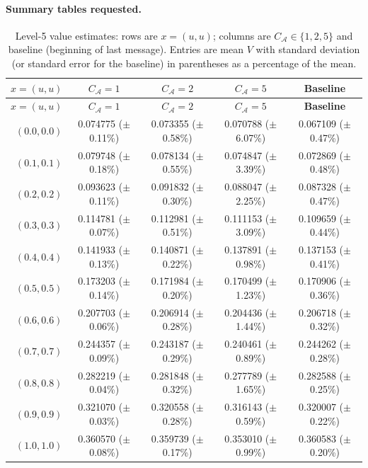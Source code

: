 \documentclass[11pt]{article}
\theoremstyle{definition}
\theoremstyle{plain}
\begin{document}
\begin{appendices}
\paragraph{Summary tables requested.}
\begin{longtable}{@{}rcccc@{}}
\caption{Level-5 value estimates: rows are $x=(u,u)$; columns are $C_{\mathcal A}\in\{1,2,5\}$ and baseline (beginning of last message). Entries are mean $V$ with standard deviation (or standard error for the baseline) in parentheses as a percentage of the mean.} \\
\toprule
\textbf{$x=(u,u)$} & \textbf{$C_{\mathcal A}=1$} & \textbf{$C_{\mathcal A}=2$} & \textbf{$C_{\mathcal A}=5$} & \textbf{Baseline} \\
\midrule
\endfirsthead
\toprule
\textbf{$x=(u,u)$} & \textbf{$C_{\mathcal A}=1$} & \textbf{$C_{\mathcal A}=2$} & \textbf{$C_{\mathcal A}=5$} & \textbf{Baseline} \\
\midrule
\endhead
$(0.0,0.0)$ & 0.074775 (\(\pm\) 0.11\%) & 0.073355 (\(\pm\) 0.58\%) & 0.070788 (\(\pm\) 6.07\%) & 0.067109 (\(\pm\) 0.47\%) \\
$(0.1,0.1)$ & 0.079748 (\(\pm\) 0.18\%) & 0.078134 (\(\pm\) 0.55\%) & 0.074847 (\(\pm\) 3.39\%) & 0.072869 (\(\pm\) 0.48\%) \\
$(0.2,0.2)$ & 0.093623 (\(\pm\) 0.11\%) & 0.091832 (\(\pm\) 0.30\%) & 0.088047 (\(\pm\) 2.25\%) & 0.087328 (\(\pm\) 0.47\%) \\
$(0.3,0.3)$ & 0.114781 (\(\pm\) 0.07\%) & 0.112981 (\(\pm\) 0.51\%) & 0.111153 (\(\pm\) 3.09\%) & 0.109659 (\(\pm\) 0.44\%) \\
$(0.4,0.4)$ & 0.141933 (\(\pm\) 0.13\%) & 0.140871 (\(\pm\) 0.22\%) & 0.137891 (\(\pm\) 0.98\%) & 0.137153 (\(\pm\) 0.41\%) \\
$(0.5,0.5)$ & 0.173203 (\(\pm\) 0.14\%) & 0.171984 (\(\pm\) 0.20\%) & 0.170499 (\(\pm\) 1.23\%) & 0.170906 (\(\pm\) 0.36\%) \\
$(0.6,0.6)$ & 0.207703 (\(\pm\) 0.06\%) & 0.206914 (\(\pm\) 0.28\%) & 0.204436 (\(\pm\) 1.44\%) & 0.206718 (\(\pm\) 0.32\%) \\
$(0.7,0.7)$ & 0.244357 (\(\pm\) 0.09\%) & 0.243187 (\(\pm\) 0.29\%) & 0.240461 (\(\pm\) 0.89\%) & 0.244262 (\(\pm\) 0.28\%) \\
$(0.8,0.8)$ & 0.282219 (\(\pm\) 0.04\%) & 0.281848 (\(\pm\) 0.32\%) & 0.277789 (\(\pm\) 1.65\%) & 0.282588 (\(\pm\) 0.25\%) \\
$(0.9,0.9)$ & 0.321070 (\(\pm\) 0.03\%) & 0.320558 (\(\pm\) 0.28\%) & 0.316143 (\(\pm\) 0.59\%) & 0.320007 (\(\pm\) 0.22\%) \\
$(1.0,1.0)$ & 0.360570 (\(\pm\) 0.08\%) & 0.359739 (\(\pm\) 0.17\%) & 0.353010 (\(\pm\) 0.99\%) & 0.360583 (\(\pm\) 0.20\%) \\
\bottomrule
\end{longtable}



\end{appendices}
\end{document}
